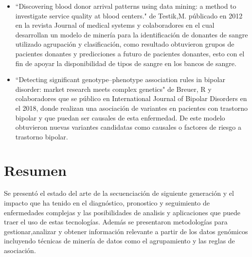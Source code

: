 \begin{itemize}
	\item ``Discovering blood donor arrival patterns using data mining: a method to investigate service quality at blood centers."  de Testik,M. públicado en 2012 en la revista  Journal of medical systems y colaboradores en el cual desarrollan un modelo de minería para la identificación de donantes de sangre utilizado agrupación y clasificación, como resultado obtuvieron grupos de pacientes donantes y predicciones a futuro de pacientes donantes, esto con el fin de apoyar la disponibilidad de tipos de sangre en los bancos de sangre. 
	
	\item ``Detecting significant genotype–phenotype association rules in bipolar disorder: market research meets complex genetics" de Breuer, R y colaboradores que se público  en International Journal of Bipolar Disorders en el 2018, donde realizan una asociación de variantes en pacientes con trastorno bipolar y que puedan ser causales de esta enfermedad. De este modelo obtuvieron nuevas variantes  candidatas como causales o factores de riesgo a trastorno bipolar.

\end{itemize}


\section*{Resumen}

Se presentó el estado del arte de la secuenciación de siguiente generación y el impacto que ha tenido en el diagnóstico, pronostico y seguimiento de enfermedades complejas y las posibilidades de analisis y aplicaciones que puede traer el uso de estas tecnologías. Además se presentaron metodologías para gestionar,analizar y obtener información relevante a partir de los datos genómicos incluyendo técnicas de minería de datos como el agrupamiento y las reglas de asociación. 

